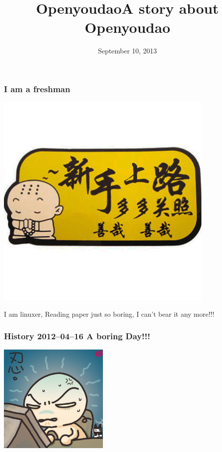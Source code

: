 \documentclass[10pt]{beamer}
\title{Openyoudao}
\title{A story about Openyoudao}
\date{September 10, 2013}
\begin{document}
\begin{CJK*}{UTF8}{song} %
\begin{frame}[plain]
  \titlepage
\end{frame}

\begin{frame}
  \frametitle{\Large{I am a freshman}}
\begin{center} 
  \includegraphics[width=0.8\textwidth]{newer.jpg}
  
\end{center}
\medskip
\quad
\qquad

I am linuxer, Reading paper just so boring, I can't bear it any more!!!
\end{frame}

\begin{frame}
  \frametitle{\Large{History 2012--04--16 A boring Day!!!}}

\begin{center} 
  \includegraphics[width=0.4\textwidth]{pic1.jpg}
\end{center}
\medskip
\quad
\qquad


\end{frame}
\end{CJK*}
\end{document}
